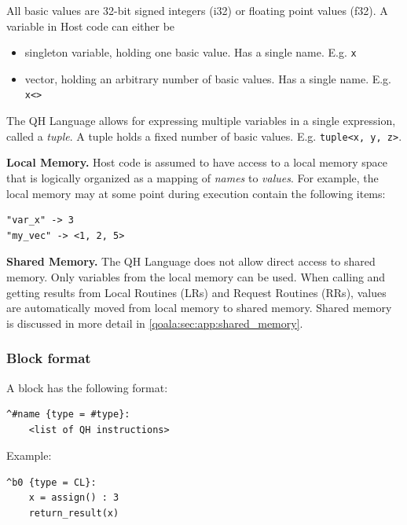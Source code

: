 All basic values are 32-bit signed integers (i32) or floating point values (f32).
A variable in Host code can either be
\begin{itemize}
\item singleton variable, holding one basic value. Has a single name. E.g. \texttt{x}
\item vector, holding an arbitrary number of basic values. Has a single name. E.g. \texttt{x<>}
\end{itemize}

The QH Language allows for expressing multiple variables in a single expression, called a \textit{tuple}.
A tuple holds a fixed number of basic values. E.g. \texttt{tuple<x, y, z>}.

\textbf{Local Memory.}
Host code is assumed to have access to a local memory space that is logically organized as a mapping of \textit{names} to \textit{values}.
For example, the local memory may at some point during execution contain the following items:

\begin{lstlisting}
"var_x" -> 3
"my_vec" -> <1, 2, 5>
\end{lstlisting}


\textbf{Shared Memory.}
The QH Language does not allow direct access to shared memory.
Only variables from the local memory can be used.
When calling and getting results from Local Routines (LRs) and Request Routines (RRs), values are automatically
moved from local memory to shared memory. 
Shared memory is discussed in more detail in \cref{qoala:sec:app:shared_memory}.

\subsubsection{Block format}

A block has the following format:
\begin{lstlisting}
^#name {type = #type}:
    <list of QH instructions>
\end{lstlisting}

Example:
\begin{lstlisting}
^b0 {type = CL}:
    x = assign() : 3
    return_result(x)
\end{lstlisting}


